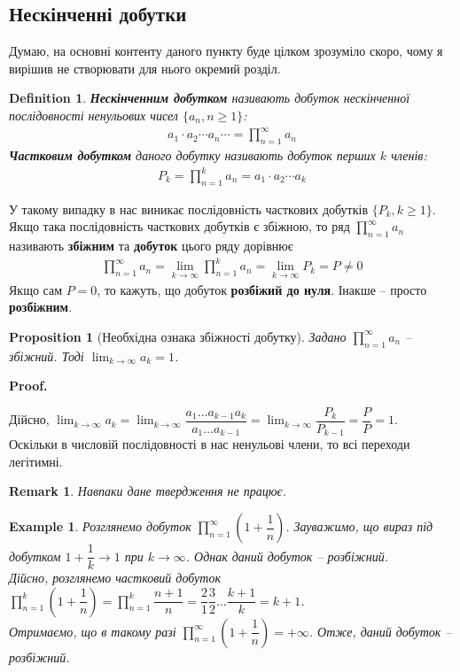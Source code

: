 \documentclass[a4paper, 10pt]{article}
\makeatletter
\theoremstyle{theoremdd}
\theoremstyle{theoremdd}
\theoremstyle{theoremdd}
\newtheorem{definition}[theorem]{Definition}
\theoremstyle{theoremdd}
\theoremstyle{theoremdd}
\newtheorem{example}[theorem]{Example}
\theoremstyle{theoremdd}
\newtheorem{proposition}[theorem]{Proposition}
\theoremstyle{theoremdd}
\newtheorem{remark}[theorem]{Remark}
\theoremstyle{theoremdd}
\theoremstyle{theoremdd}
\renewenvironment{proof}[1][Proof.\\]{\par
\pushQED{\hfill \qed}%
\normalfont \topsep6\p@\@plus6\p@\relax
\trivlist
\item\relax
{\bfseries
#1\@addpunct{.}}\hspace\labelsep\ignorespaces
}{%
\popQED\endtrivlist\@endpefalse
}
\makeatother
\begin{document}
\subsection{Нескінченні добутки}
Думаю, на основні контенту даного пункту буде цілком зрозуміло скоро, чому я вирішив не створювати для нього окремий розділ.

\begin{definition} 
\textbf{Нескінченним добутком} називають добуток нескінченної послідовності ненульових чисел $\{a_n, n \geq 1\}$:
\begin{align*}
a_1 \cdot a_2 \cdots a_n \cdots = \prod_{n=1}^{\infty} a_n
\end{align*}
\textbf{Частковим добутком} даного добутку називають добуток перших $k$ членів:
\begin{align*}
P_k = \prod_{n=1}^k a_n = a_1 \cdot a_2 \cdots a_k
\end{align*}
\end{definition}
У такому випадку в нас виникає послідовність часткових добутків $\{P_k, k \geq 1\}$.\\
Якщо така послідовність часткових добутків є збіжною, то ряд $\displaystyle \prod_{n=1}^{\infty} a_n$ називають \textbf{збіжним} та \textbf{добуток} цього ряду дорівнює
\begin{align*}
\prod_{n=1}^{\infty} a_n = \lim_{k \to \infty} \prod_{n=1}^k a_n = \lim_{k \to \infty} P_k = P \neq 0
\end{align*}
Якщо сам $P = 0$, то кажуть, що добуток \textbf{розбіжий до нуля}. Інакше -- просто \textbf{розбіжним}.

\begin{proposition}[Необхідна ознака збіжності добутку]
Задано $\displaystyle\prod_{n=1}^\infty a_n$ -- збіжний. Тоді $\displaystyle\lim_{k \to \infty} a_k = 1$.
\end{proposition}

\begin{proof}
Дійсно, $\displaystyle\lim_{k \to \infty} a_k = \lim_{k \to \infty} \dfrac{a_1 \dots a_{k-1} a_k}{a_1 \dots a_{k-1}} = \lim_{k \to \infty} \dfrac{P_k}{P_{k-1}} = \dfrac{P}{P} = 1$.\\
Оскільки в числовій послідовності в нас ненульові члени, то всі переходи легітимні.
\end{proof}

\begin{remark}
Навпаки дане твердження не працює.
\end{remark}

\begin{example}
Розглянемо добуток $\displaystyle\prod_{n=1}^\infty \left( 1 + \dfrac{1}{n} \right)$. Зауважимо, що вираз під добутком $1 + \dfrac{1}{k} \to 1$ при $k \to \infty$. Однак даний добуток -- розбіжний.\\
Дійсно, розглянемо частковий добуток $\displaystyle\prod_{n=1}^k \left( 1 + \dfrac{1}{n} \right) = \prod_{n=1}^k \dfrac{n+1}{n} = \dfrac{2}{1} \dfrac{3}{2} \dots \dfrac{k+1}{k} = k+1$.\\
Отримаємо, що в такому разі $\displaystyle\prod_{n=1}^\infty \left( 1 + \dfrac{1}{n} \right) = +\infty$. Отже, даний добуток -- розбіжний.
\end{example}
\end{document}

